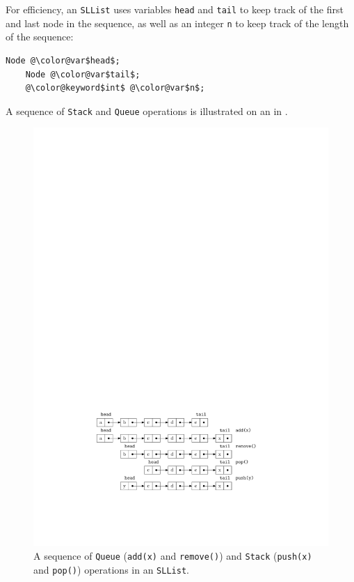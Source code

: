 For efficiency, an \mbox{\texttt{SLList}} uses variables \mbox{\texttt{{\color{var}head}}} and \mbox{\texttt{{\color{var}tail}}} to keep
track of the first and last node in the sequence, as well as an integer
\mbox{\texttt{{\color{var}n}}} to keep track of the length of the sequence:
\begin{Verbatim}[tabsize=2,frame=single,commandchars=\\@\$,label=\texttt{SLList},labelposition=topline]
	Node @\color@var$head$;
	Node @\color@var$tail$;
	@\color@keyword$int$ @\color@var$n$;
\end{Verbatim}
A sequence of \mbox{\texttt{Stack}} and \mbox{\texttt{Queue}} operations is illustrated on an
 in .

\begin{figure}
  \begin{center}
    \includegraphics{figs/sllist}
  \end{center}
  \caption{A sequence of \mbox{\texttt{Queue}} (\mbox{\texttt{add({\color{var}x})}} and \mbox{\texttt{remove()}}) and \mbox{\texttt{Stack}} (\mbox{\texttt{push({\color{var}x})}} and \mbox{\texttt{pop()}}) operations in an \mbox{\texttt{SLList}}.}
\end{figure}


